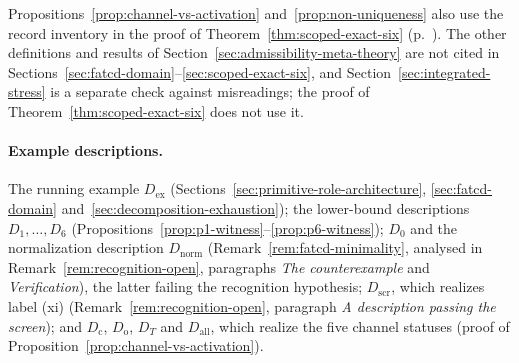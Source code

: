 Propositions~\ref{prop:channel-vs-activation} and~\ref{prop:non-uniqueness}
also use the record inventory in the proof of
Theorem~\ref{thm:scoped-exact-six} (p.~\pageref{thm:scoped-exact-six}). The other definitions and results of
Section~\ref{sec:admissibility-meta-theory} are not cited in
Sections~\ref{sec:fatcd-domain}--\ref{sec:scoped-exact-six}, and
Section~\ref{sec:integrated-stress} is a separate check against misreadings;
the proof of Theorem~\ref{thm:scoped-exact-six} does not use it.

\paragraph{Example descriptions.} The running example \(D_{\mathrm{ex}}\)
(Sections~\ref{sec:primitive-role-architecture}, \ref{sec:fatcd-domain}
and~\ref{sec:decomposition-exhaustion}); the lower-bound descriptions
\(D_1,\dots,D_6\) (Propositions~\ref{prop:p1-witness}--\ref{prop:p6-witness});
\(D_0\) and the normalization description \(D_{\mathrm{norm}}\)
(Remark~\ref{rem:fatcd-minimality}, analysed in
Remark~\ref{rem:recognition-open}, paragraphs \emph{The counterexample} and \emph{Verification}), the latter failing the recognition
hypothesis; \(D_{\mathrm{scr}}\), which realizes label (xi)
(Remark~\ref{rem:recognition-open}, paragraph \emph{A description passing the screen}); and \(D_{\mathrm c}\), \(D_{\mathrm o}\),
\(D_T\) and \(D_{\mathrm{all}}\), which realize the five channel statuses
(proof of Proposition~\ref{prop:channel-vs-activation}).
